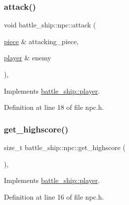 \subsubsection{\texorpdfstring{attack()}{attack()}}
{\footnotesize\ttfamily void battle\+\_\+ship\+::npc\+::attack (\begin{DoxyParamCaption}\item[{\hyperlink{classbattle__ship_1_1piece}{piece} \&}]{attacking\+\_\+piece,  }\item[{\hyperlink{classbattle__ship_1_1player}{player} \&}]{enemy }\end{DoxyParamCaption})\hspace{0.3cm}{\ttfamily [inline]}, {\ttfamily [virtual]}}



Implements \hyperlink{classbattle__ship_1_1player_a86be2256620cd5e20da6db7be8afdbc8}{battle\+\_\+ship\+::player}.



Definition at line 18 of file npc.\+h.

\mbox{\label{classbattle__ship_1_1npc_acb3ad1c27c948ae968697c795f10a6b9}} 
\subsubsection{\texorpdfstring{get\+\_\+highscore()}{get\_highscore()}}
{\footnotesize\ttfamily size\+\_\+t battle\+\_\+ship\+::npc\+::get\+\_\+highscore (\begin{DoxyParamCaption}{ }\end{DoxyParamCaption})\hspace{0.3cm}{\ttfamily [inline]}, {\ttfamily [virtual]}}



Implements \hyperlink{classbattle__ship_1_1player_a9b74e59f4b120d38ad591dba6a1d1ba7}{battle\+\_\+ship\+::player}.



Definition at line 16 of file npc.\+h.

\mbox{\label{classbattle__ship_1_1npc_ab81843d30e5f8801a8fe479d44ead157}} 
